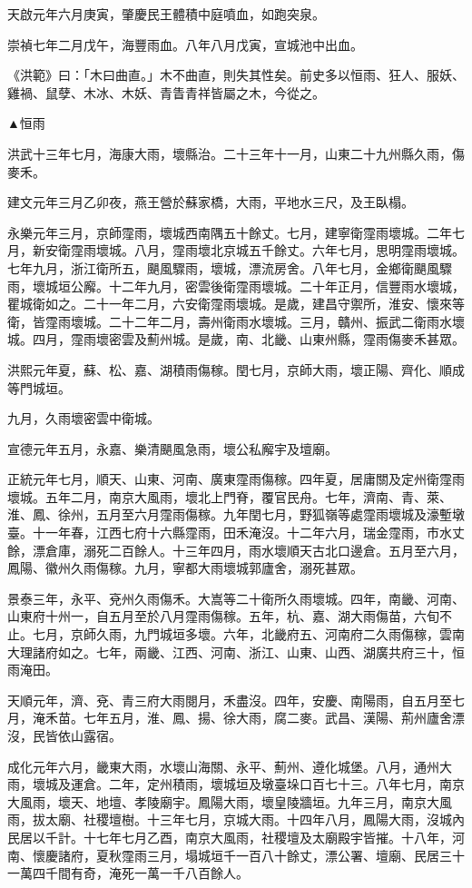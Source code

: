 \begin{pinyinscope}
天啟元年六月庚寅，肇慶民王體積中庭噴血，如跑突泉。

崇禎七年二月戊午，海豐雨血。八年八月戊寅，宣城池中出血。

《洪範》曰：「木曰曲直。」木不曲直，則失其性矣。前史多以恒雨、狂人、服妖、雞禍、鼠孽、木冰、木妖、青眚青祥皆屬之木，今從之。

▲恒雨

洪武十三年七月，海康大雨，壞縣治。二十三年十一月，山東二十九州縣久雨，傷麥禾。

建文元年三月乙卯夜，燕王營於蘇家橋，大雨，平地水三尺，及王臥榻。

永樂元年三月，京師霪雨，壞城西南隅五十餘丈。七月，建寧衛霪雨壞城。二年七月，新安衛霪雨壞城。八月，霪雨壞北京城五千餘丈。六年七月，思明霪雨壞城。七年九月，浙江衛所五，颶風驟雨，壞城，漂流房舍。八年七月，金鄉衛颶風驟雨，壞城垣公廨。十二年九月，密雲後衛霪雨壞城。二十年正月，信豐雨水壞城，瞿城衛如之。二十一年二月，六安衛霪雨壞城。是歲，建昌守禦所，淮安、懷來等衛，皆霪雨壞城。二十二年二月，壽州衛雨水壞城。三月，贛州、振武二衛雨水壞城。四月，霪雨壞密雲及薊州城。是歲，南、北畿、山東州縣，霪雨傷麥禾甚眾。

洪熙元年夏，蘇、松、嘉、湖積雨傷稼。閏七月，京師大雨，壞正陽、齊化、順成等門城垣。

九月，久雨壞密雲中衛城。

宣德元年五月，永嘉、樂清颶風急雨，壞公私廨宇及壇廟。

正統元年七月，順天、山東、河南、廣東霪雨傷稼。四年夏，居庸關及定州衛霪雨壞城。五年二月，南京大風雨，壞北上門脊，覆官民舟。七年，濟南、青、萊、淮、鳳、徐州，五月至六月霪雨傷稼。九年閏七月，野狐嶺等處霪雨壞城及濠塹墩臺。十一年春，江西七府十六縣霪雨，田禾淹沒。十二年六月，瑞金霪雨，市水丈餘，漂倉庫，溺死二百餘人。十三年四月，雨水壞順天古北口邊倉。五月至六月，鳳陽、徽州久雨傷稼。九月，寧都大雨壞城郭廬舍，溺死甚眾。

景泰三年，永平、兗州久雨傷禾。大嵩等二十衛所久雨壞城。四年，南畿、河南、山東府十州一，自五月至於八月霪雨傷稼。五年，杭、嘉、湖大雨傷苗，六旬不止。七月，京師久雨，九門城垣多壞。六年，北畿府五、河南府二久雨傷稼，雲南大理諸府如之。七年，兩畿、江西、河南、浙江、山東、山西、湖廣共府三十，恒雨淹田。

天順元年，濟、兗、青三府大雨閱月，禾盡沒。四年，安慶、南陽雨，自五月至七月，淹禾苗。七年五月，淮、鳳、揚、徐大雨，腐二麥。武昌、漢陽、荊州廬舍漂沒，民皆依山露宿。

成化元年六月，畿東大雨，水壞山海關、永平、薊州、遵化城堡。八月，通州大雨，壞城及運倉。二年，定州積雨，壞城垣及墩臺垛口百七十三。八年七月，南京大風雨，壞天、地壇、孝陵廟宇。鳳陽大雨，壞皇陵牆垣。九年三月，南京大風雨，拔太廟、社稷壇樹。十三年七月，京城大雨。十四年八月，鳳陽大雨，沒城內民居以千計。十七年七月乙酉，南京大風雨，社稷壇及太廟殿宇皆摧。十八年，河南、懷慶諸府，夏秋霪雨三月，塌城垣千一百八十餘丈，漂公署、壇廟、民居三十一萬四千間有奇，淹死一萬一千八百餘人。


\end{pinyinscope}
